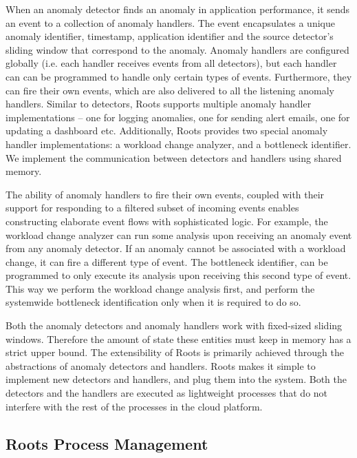 When an anomaly detector finds an anomaly in application performance, it sends an event
to a collection of anomaly handlers. The event encapsulates a unique anomaly identifier, 
timestamp, application identifier and the source detector's sliding window that correspond to the
anomaly. Anomaly handlers are configured globally (i.e. each handler
receives events from all detectors), but each handler can can be programmed to handle only
certain types of events. Furthermore, they can fire their own events, which are also delivered to
all the listening anomaly handlers. Similar to detectors, Roots supports multiple anomaly handler
implementations -- one for logging anomalies, one for sending alert emails, one
for updating a dashboard etc. Additionally, Roots provides two special anomaly handler
implementations: a workload change analyzer, and a bottleneck identifier.
We implement the communication between detectors and handlers 
using shared memory.

The ability of anomaly handlers to fire their own events, coupled with their support
for responding to a filtered subset of incoming events enables constructing
elaborate event flows with sophisticated logic. For example, the workload
change analyzer can run some analysis upon receiving an anomaly event
from any anomaly detector. If an anomaly cannot be associated with a workload
change, it can fire a different type of event. The bottleneck identifier, can
be programmed to only execute its analysis upon receiving this second type of event.
This way we perform the workload change analysis first, and perform the
systemwide bottleneck identification only when it is required to do so.

Both the anomaly detectors and anomaly handlers work with fixed-sized sliding windows.
Therefore the amount of state these entities must keep in memory has
a strict upper bound. 
The extensibility of Roots is primarily achieved through the abstractions of anomaly
detectors and handlers. Roots makes it simple to implement new detectors and handlers,
and plug them into the system. Both the detectors and the handlers are executed
as lightweight processes that do not interfere with the rest of the processes in
the cloud platform. 

\subsection{Roots Process Management}
\label{sec:process_mgt}

